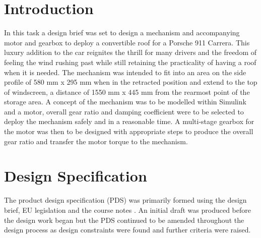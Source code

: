 \documentclass[a4paper]{article}
\begin{document}
\tableofcontents
\printnomenclature



\section{Introduction}

In this task a design brief was set to design a mechanism and accompanying motor and gearbox to deploy a convertible roof for a Porsche 911 Carrera. This luxury addition to the car reignites the thrill for many drivers and the freedom of feeling the wind rushing past while still retaining the practicality of having a roof when it is needed. The mechanism was intended to fit into an area on the side profile of 580 mm x 295 mm when in the retracted position and extend to the top of windscreen, a distance of 1550 mm x 445 mm from the rearmost point of the storage area. A concept of the mechanism was to be modelled within Simulink and a motor, overall gear ratio and damping coefficient were to be selected to deploy the mechanism safely and in a reasonable time. A multi-stage gearbox for the motor was then to be designed with appropriate steps to produce the overall gear ratio and transfer the motor torque to the mechanism.

\section{Design Specification}

The product design specification (PDS) was primarily formed using the design brief, EU legislation \cite{UN/ECE} and the course notes \cite{Coursenotes}. An initial draft was produced before the design work began but the PDS continued to be amended throughout the design process as design constraints were found and further criteria were raised.
\end{document}

